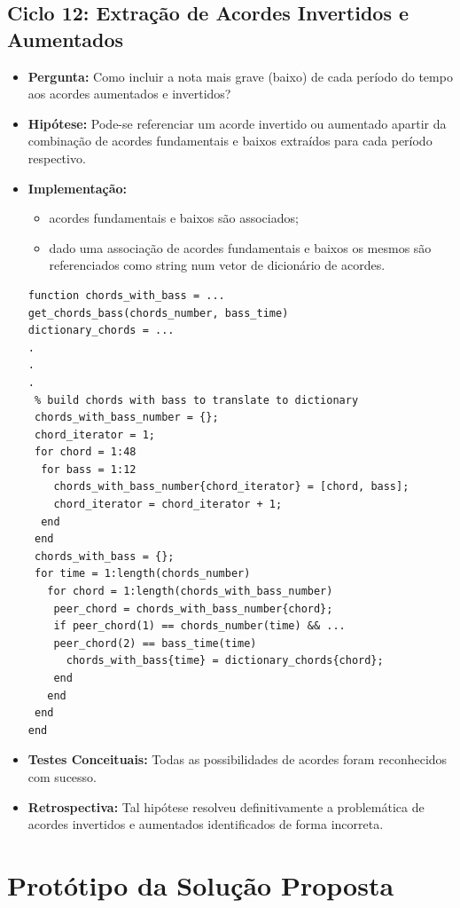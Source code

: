 \subsection{Ciclo 12: Extração de Acordes Invertidos e Aumentados}
\label{subsec:ciclo_12}
\begin{itemize}
\item \textbf{Pergunta:} Como incluir a nota mais grave (baixo) de cada período do tempo aos acordes aumentados e invertidos?
\item \textbf{Hipótese:} Pode-se referenciar um acorde invertido ou aumentado apartir da combinação de acordes fundamentais e baixos extraídos para cada período respectivo.
\item \textbf{Implementação:}
\begin{itemize} 
	\item acordes fundamentais e baixos são associados;
	\item dado uma associação de acordes fundamentais e baixos os mesmos são referenciados como string num vetor de dicionário de acordes.
\end{itemize}
\begin{lstlisting}
function chords_with_bass = ...
get_chords_bass(chords_number, bass_time)
dictionary_chords = ...
.
.
.
 % build chords with bass to translate to dictionary
 chords_with_bass_number = {};
 chord_iterator = 1;
 for chord = 1:48
  for bass = 1:12
    chords_with_bass_number{chord_iterator} = [chord, bass];
    chord_iterator = chord_iterator + 1;
  end
 end
 chords_with_bass = {};
 for time = 1:length(chords_number)
   for chord = 1:length(chords_with_bass_number)
    peer_chord = chords_with_bass_number{chord};
    if peer_chord(1) == chords_number(time) && ...
    peer_chord(2) == bass_time(time)
      chords_with_bass{time} = dictionary_chords{chord};
    end
   end
 end
end
\end{lstlisting}
\item \textbf{Testes Conceituais:} Todas as possibilidades de acordes foram reconhecidos com sucesso.
\item \textbf{Retrospectiva:} Tal hipótese resolveu definitivamente a problemática de acordes invertidos e aumentados identificados de forma incorreta.
\end{itemize}

\section{Protótipo da Solução Proposta}
\label{sec:prototipo}

